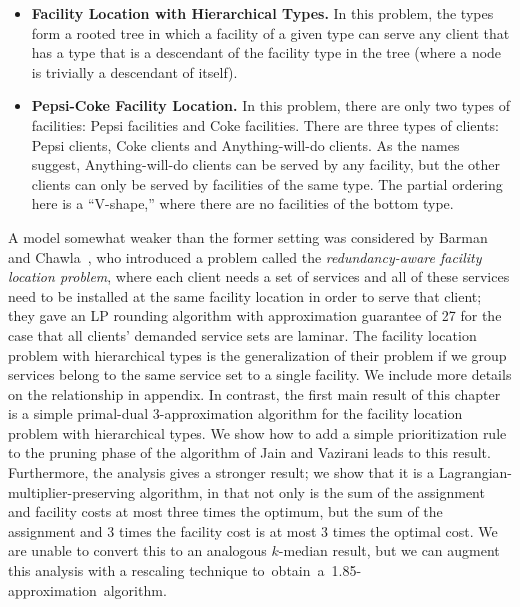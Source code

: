 \begin{itemize}
\item \textbf{Facility Location with Hierarchical Types.} In this problem, the types form a rooted tree in which a facility of a given type can serve any client that has a type that is a descendant of the facility type in the tree (where a node is trivially a descendant of itself).

\item \textbf{Pepsi-Coke Facility Location.} In this problem, there are only two types of facilities: Pepsi facilities and Coke facilities. There are three types of clients: Pepsi clients, Coke clients and Anything-will-do clients. As the names suggest, Anything-will-do clients can be served by any facility, but the other clients can only be served by facilities of the same type. The partial ordering here is a ``V-shape,'' where there are no facilities of the bottom type.

\end{itemize}

A model somewhat weaker than the former setting was considered by Barman and
Chawla~\cite{DBLP:journals/corr/abs-1110-4150}, who introduced a problem called the {\it
  redundancy-aware facility location problem}, where each client needs a set of services
and all of these services need to be installed at the same facility location in order to
serve that client; they gave an LP rounding algorithm with approximation guarantee of 27
for the case that all clients' demanded service sets are laminar. The facility location
problem with hierarchical types is the generalization of their problem if we group
services belong to the same service set to a single facility. We include more details on the relationship in appendix. In contrast, the first main
result of this chapter is a simple primal-dual 3-approximation algorithm for the facility
location problem with hierarchical types. We show how to add a simple prioritization rule
to the pruning phase of the algorithm of Jain and Vazirani \cite{jain2001approximation}
leads to this result. Furthermore, the analysis gives a stronger result; we show that it
is a Lagrangian-multiplier-preserving algorithm, in that not only is the sum of the
assignment and facility costs at most three times the optimum, but the sum of the
assignment and 3 times the facility cost is at most 3 times the optimal cost. We are
unable to convert this to an analogous $k$-median result, but we can augment this analysis with a rescaling technique \mbox{to obtain a 1.85-approximation algorithm.}

